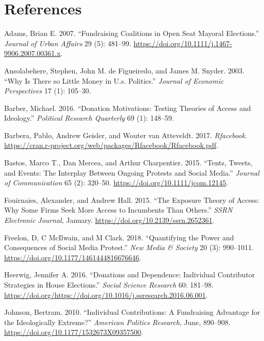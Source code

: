 \documentclass[12pt,]{article}
\begin{document}
\hypertarget{references}{%
\section*{References}\label{references}}

\hypertarget{refs}{}
\leavevmode\hypertarget{ref-adams2016}{}%
Adams, Brian E. 2007. ``Fundraising Coalitions in Open Seat Mayoral
Elections.'' \emph{Journal of Urban Affairs} 29 (5): 481--99.
\url{https://doi.org/10.1111/j.1467-9906.2007.00361.x}.

\leavevmode\hypertarget{ref-ansolabehere2003}{}%
Ansolabehere, Stephen, John M. de Figueiredo, and James M. Snyder. 2003.
``Why Is There so Little Money in U.s. Politics.'' \emph{Journal of
Economic Perspectives} 17 (1): 105--30.

\leavevmode\hypertarget{ref-barber2016}{}%
Barber, Michael. 2016. ``Donation Motivations: Testing Theories of
Access and Ideology.'' \emph{Political Research Quarterly} 69 (1):
148--59.

\leavevmode\hypertarget{ref-rfacebook}{}%
Barbera, Pablo, Andrew Geisler, and Wouter van Atteveldt. 2017.
\emph{Rfacebook}.
\url{https://cran.r-project.org/web/packages/Rfacebook/Rfacebook.pdf}.

\leavevmode\hypertarget{ref-bastos2015}{}%
Bastos, Marco T., Dan Mercea, and Arthur Charpentier. 2015. ``Tents,
Tweets, and Events: The Interplay Between Ongoing Protests and Social
Media.'' \emph{Journal of Communication} 65 (2): 320--50.
\url{https://doi.org/10.1111/jcom.12145}.

\leavevmode\hypertarget{ref-fouirnaies2015}{}%
Fouirnaies, Alexander, and Andrew Hall. 2015. ``The Exposure Theory of
Access: Why Some Firms Seek More Access to Incumbents Than Others.''
\emph{SSRN Electronic Journal}, January.
\url{https://doi.org/10.2139/ssrn.2652361}.

\leavevmode\hypertarget{ref-freelon2018}{}%
Freelon, D, C McIlwain, and M Clark. 2018. ``Quantifying the Power and
Consequences of Social Media Protest.'' \emph{New Media \& Society} 20
(3): 990--1011. \url{https://doi.org/10.1177/1461444816676646}.

\leavevmode\hypertarget{ref-heerwig2016}{}%
Heerwig, Jennifer A. 2016. ``Donations and Dependence: Individual
Contributor Strategies in House Elections.'' \emph{Social Science
Research} 60: 181--98.
\url{https://doi.org/https://doi.org/10.1016/j.ssresearch.2016.06.001}.

\leavevmode\hypertarget{ref-johnson2010}{}%
Johnson, Bertram. 2010. ``Individual Contributions: A Fundraising
Advantage for the Ideologically Extreme?'' \emph{American Politics
Research}, June, 890--908.
\url{https://doi.org/10.1177/1532673X09357500}.
\end{document}
